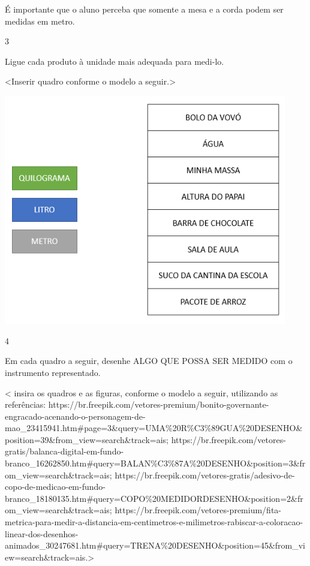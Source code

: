 {É importante que o aluno perceba que somente a mesa e a
corda podem ser medidas em metro.

\num{3}

Ligue cada produto à unidade mais adequada para medi-lo.

\textless{}Inserir quadro conforme o modelo a seguir.\textgreater{}

\includegraphics[width=4.86920in,height=3.96016in]{media/image25.png}

\num{4}

Em cada quadro a seguir, desenhe ALGO QUE POSSA SER MEDIDO com o instrumento representado.

\textless{} insira os quadros e as figuras, conforme o modelo a seguir,
utilizando as referências:
https://br.freepik.com/vetores-premium/bonito-governante-engracado-acenando-o-personagem-de-mao\_23415941.htm\#page=3\&query=UMA\%20R\%C3\%89GUA\%20DESENHO\&position=39\&from\_view=search\&track=ais;
https://br.freepik.com/vetores-gratis/balanca-digital-em-fundo-branco\_16262850.htm\#query=BALAN\%C3\%87A\%20DESENHO\&position=3\&from\_view=search\&track=ais;
https://br.freepik.com/vetores-gratis/adesivo-de-copo-de-medicao-em-fundo-branco\_18180135.htm\#query=COPO\%20MEDIDORDESENHO\&position=2\&from\_view=search\&track=ais;
https://br.freepik.com/vetores-premium/fita-metrica-para-medir-a-distancia-em-centimetros-e-milimetros-rabiscar-a-coloracao-linear-dos-desenhos-animados\_30247681.htm\#query=TRENA\%20DESENHO\&position=45\&from\_view=search\&track=ais.\textgreater{}

}
